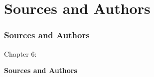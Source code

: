 %

\section{Sources and Authors}
\begin{frame}[fragile]
	\frametitle{Sources and Authors}

	\begin{center}\huge{Chapter 6:}\end{center}
	\begin{center}\huge{\color{typo3darkgrey}\textbf{Sources and Authors}}\end{center}

\end{frame}


